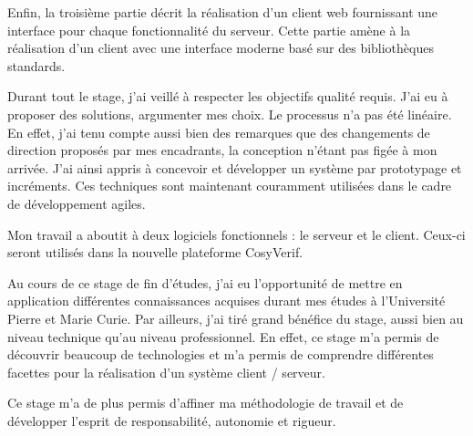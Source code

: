 \documentclass{report}
\begin{document}
Enfin, la troisième partie décrit la réalisation d'un client web fournissant
une interface pour chaque fonctionnalité du serveur. Cette partie amène à la réalisation d'un client avec une interface moderne basé sur des bibliothèques standards.

Durant tout le stage, j'ai veillé à respecter les objectifs qualité requis.
J'ai eu à proposer des solutions, argumenter mes choix.
Le processus n'a pas été linéaire. En effet, j'ai tenu compte aussi bien des
remarques que des changements de direction proposés par mes encadrants,
la conception n'étant pas figée à mon arrivée.
J'ai ainsi appris à concevoir et développer un système par prototypage et incréments.
Ces techniques sont maintenant couramment utilisées dans le cadre de
développement agiles.

Mon travail a aboutit à deux logiciels fonctionnels : le serveur et le client.
Ceux-ci seront utilisés dans la nouvelle plateforme CosyVerif.

Au cours de ce stage de fin d'études, j'ai eu l'opportunité de mettre en application différentes connaissances acquises 
durant mes études à l'Université Pierre et Marie Curie. Par ailleurs, j'ai
tiré grand bénéfice du stage, aussi bien au niveau technique
qu'au niveau professionnel. En effet, ce stage m'a permis de découvrir beaucoup de technologies et m'a permis de comprendre
différentes facettes pour la réalisation d'un système client / serveur.

Ce stage m'a de plus permis d'affiner ma méthodologie de travail et de 
développer l'esprit de responsabilité, autonomie et rigueur.
\end{document}
